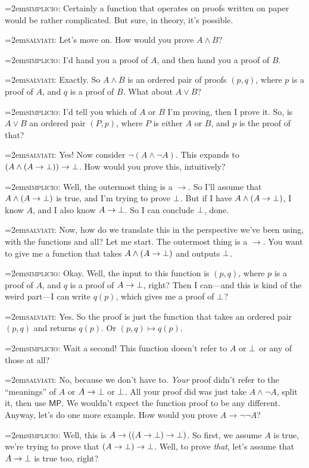 \documentclass[11pt,paper=letter]{scrartcl}
\renewcommand{\sf}{\mathsf}
\renewcommand{\land}{\wedge}
\renewcommand{\lor}{\vee}
\renewcommand{\lnot}{\neg}
\newcommand{\simp}{\vspace{0.5em}\noindent\hangindent=2em\textsc{simplicio:} }
\newcommand{\salv}{\vspace{0.5em}\noindent\hangindent=2em\textsc{salviati:} }
\begin{document}
\simp Certainly a function that operates on proofs written on paper would be rather complicated. But sure, in theory, it's possible.

\salv Let's move on. How would you prove $A \land B$?

\simp I'd hand you a proof of $A$, and then hand you a proof of $B$.

\salv Exactly. So $A \land B$ is an ordered pair of proofs $(p, q)$, where $p$ is a proof of $A$, and $q$ is a proof of $B$. What about $A \lor B$?

\simp I'd tell you which of $A$ or $B$ I'm proving, then I prove it. So, is $A \lor B$ an ordered pair $(P, p)$, where $P$ is either $A$ or $B$, and $p$ is the proof of that?

\salv Yes! Now consider $\lnot (A \land \lnot A)$. This expands to $(A \land (A \to \false)) \to \false$. How would you prove this, intuitively?

\simp Well, the outermost thing is a $\to$. So I'll assume that $A \land (A \to \false)$ is true, and I'm trying to prove $\bot$. But if I have $A \land (A \to \false)$, I know $A$, and I also know $A \to \bot$. So I can conclude $\bot$, done.

\salv Now, how do we translate this in the perspective we've been using, with the functions and all? Let me start. The outermost thing is a $\to$. You want to give me a function that takes $A \land (A \to \false)$ and outputs $\bot$.

\simp Okay. Well, the input to this function is $(p, q)$, where $p$ is a proof of $A$, and $q$ is a proof of $A \to \bot$, right? Then I can---and this is kind of the weird part---I can write $q(p)$, which gives me a proof of $\bot$?

\salv Yes. So the proof is just the function that takes an ordered pair $(p, q)$ and returns $q(p)$. Or $(p, q) \mapsto q(p)$.

\simp Wait a second! This function doesn't refer to $A$ or $\bot$ or any of those at all?

\salv No, because we don't have to. \emph{Your} proof didn't refer to the ``meanings'' of $A$ or $A \to \bot$ or $\bot$. All your proof did was just take $A \land \lnot A$, split it, then use $\sf{MP}$. We wouldn't expect the function proof to be any different. Anyway, let's do one more example. How would you prove $A \to \lnot\lnot A$?

\simp Well, this is $A \to ((A \to \bot) \to \bot)$. So first, we assume $A$ is true, we're trying to prove that $(A \to \bot) \to \bot$. Well, to prove \emph{that}, let's assume that $A \to \bot$ is true too, right?
\end{document}
